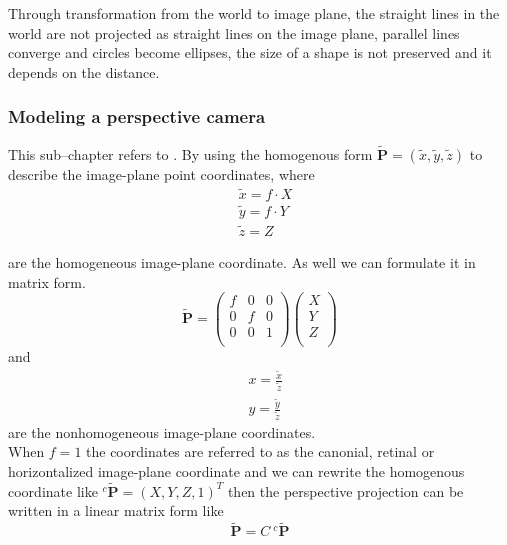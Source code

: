 \documentclass[journal,final,a4paper,twoside]{PS}
\begin{document}
Through transformation from the world to image plane, the straight lines in the world are not projected as straight lines on the image plane, parallel lines converge and circles become ellipses, the size of a shape is not preserved and it depends on the distance.

\subsubsection{Modeling a perspective camera}
This sub--chapter refers to \cite{Corke}. By using the homogenous form $\tilde{\textbf{P}}=(\tilde{x} ,\tilde{y} ,\tilde{z} )$ to describe the image-plane point coordinates, where \begin{subequations}\begin{align}
&\tilde{x}=f\cdot X\label{eq:homo_x}\\
&\tilde{y}=f\cdot Y\label{eq:homo_y}\\
&\tilde{z}=Z\label{eq:homo_z}
\end{align}
\end{subequations}


are the homogeneous image-plane coordinate. As well we can formulate it in matrix form\cite{Corke}.
\begin{equation}
\tilde{\textbf{P}} = \begin{pmatrix}
f&0&0\\
0&f&0\\
0&0&1\\
\end{pmatrix}
\begin{pmatrix}
X\\
Y\\
Z\\
\end{pmatrix}
\end{equation}
and
\begin{align}
&x=\frac{\tilde{x}}{\tilde{z}}\\& y= \frac{\tilde{y}}{\tilde{z}}
\end{align}
are the nonhomogeneous image-plane coordinates.
\\
When $f=1$ the coordinates are referred to as the canonial, retinal or horizontalized image-plane coordinate and we can rewrite the homogenous coordinate like $ {}^{c}\tilde{\textbf{P}} = (X,Y,Z,1)^T $
then the perspective projection can be written in a linear matrix form like
\begin{equation}
\tilde{\textbf{P}} = C{}~^{c}\tilde{\textbf{P}}
\end{equation}
\end{document}
